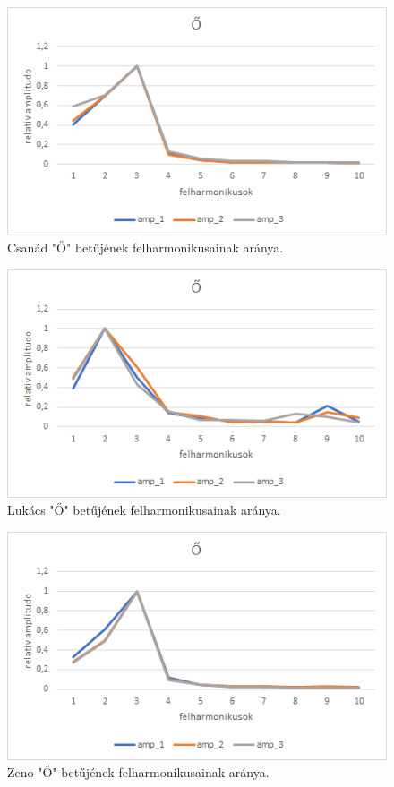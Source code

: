\documentclass[a4paper,12pt]{article}
\begin{document}
\begin{figure}[h!]
\centering
\includegraphics[scale=0.9]{csanad_o.png}
\caption{Csanád "Ő" betűjének felharmonikusainak aránya.}
\end{figure}
\newpage
\begin{figure}[h!]
\centering
\includegraphics[scale=0.9]{lukacs_o.png}
\caption{Lukács "Ő" betűjének felharmonikusainak aránya.}
\end{figure}
\begin{figure}[h!]
\centering
\includegraphics[scale=0.9]{zeno_o.png}
\caption{Zeno "Ő" betűjének felharmonikusainak aránya.}
\end{figure}
\end{document}
